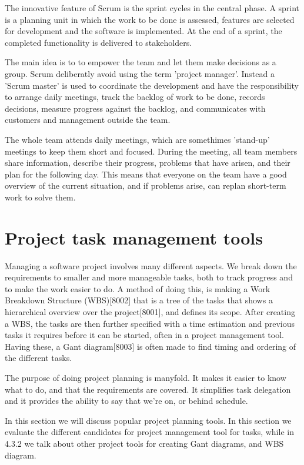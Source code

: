 \documentclass{report}
\begin{document}
The innovative feature of Scrum is the sprint cycles in the central phase. A sprint is a planning unit in which the work to be done is assessed, features are selected for development and the software is implemented. At the end of a sprint, the completed functionality is delivered to stakeholders.

The main idea is to to empower the team and let them make decisions as a group. Scrum deliberatly avoid using the term 'project manager'. Instead a 'Scrum master' is used to coordinate the development and have the responsibility to arrange daily meetings, track the backlog of work to be done, records decisions, measure progress against the backlog, and communicates with customers and management outside the team.

The whole team attends daily meetings, which are somethimes 'stand-up' meetings to keep them short and focused. During the meeting, all team members share information, describe their progress, problems that have arisen, and their plan for the following day. This means that everyone on the team have a good overview of the current situation, and if problems arise, can replan short-term work to solve them. \cite[p. 72-74]{book:sommerville}


\newpage
\section{Project task management tools}

Managing a software project involves many different aspects. We break down the requirements to smaller and more manageable tasks, both to track progress and to make the work easier to do. A method of doing this, is making a Work Breakdown Structure (WBS)[8002] that is a tree of the tasks that shows a hierarchical overview over the project[8001], and defines its scope. After creating a WBS, the tasks are then further specified with a time estimation and previous tasks it requires before it can be started, often in a project management tool. Having these, a Gant diagram[8003] is often made to find timing and ordering of the different tasks. 

The purpose of doing project planning is manyfold. It makes it easier to know what to do, and that the requirements are covered. It simplifies task delegation and it provides the ability to say that we’re on, or behind schedule.

In this section we will discuss popular project planning tools. In this section we evaluate the different candidates for project management tool for tasks, while in 4.3.2 we talk about other project tools for creating Gant diagrams, and WBS diagram.
\end{document}

